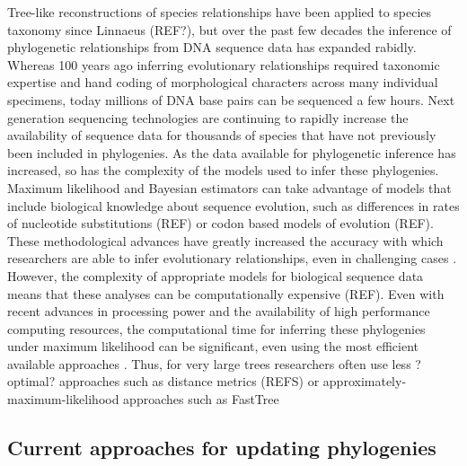 \documentclass[10pt]{article}
\begin{document}
Tree-like reconstructions of species relationships have been applied to species taxonomy since Linnaeus (REF?), but over the past few decades the inference of phylogenetic relationships from DNA sequence data has expanded rabidly. Whereas 100 years ago inferring evolutionary relationships required taxonomic expertise and hand coding of morphological characters across many individual specimens, today millions of DNA base pairs can be sequenced a few hours. Next generation sequencing technologies are continuing to rapidly increase the availability of sequence data for thousands of species that have not previously been included in phylogenies. As the data available for phylogenetic inference has increased, so has the complexity of the models used to infer these phylogenies. Maximum likelihood and Bayesian estimators can take advantage of models that include biological knowledge about sequence evolution, such as differences in rates of nucleotide substitutions (REF) or codon based models of evolution (REF). These methodological advances have greatly increased the accuracy with which researchers are able to infer evolutionary relationships, even in challenging cases \cite{kuhner_simulation_1994}. However, the complexity of appropriate models for biological sequence data means that these analyses can be computationally expensive (REF). Even with recent advances in processing power and the availability of high performance computing resources, the computational time for inferring these phylogenies under maximum likelihood can be significant, even using the most efficient available approaches \cite{stamatakis_RAxML-VI-HPC:_2006}.  Thus, for very large trees researchers often use less ?optimal? approaches such as distance metrics (REFS) or approximately-maximum-likelihood approaches such as FastTree \cite{price_fasttree:_2009, price_fasttree_2010}


\subsection*{Current approaches for updating phylogenies}
\end{document}
